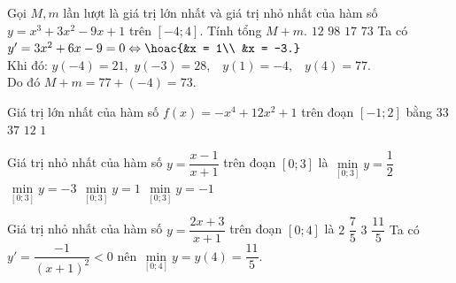 \begin{ex}
	Gọi $ M, m $ lần lượt là giá trị lớn nhất và giá trị nhỏ nhất của hàm số $ y = x^3 + 3x^2 - 9x + 1 $ trên $ [-4;4] $. Tính tổng $ M + m. $
	\choice 
	{$ 12 $}
	{$ 98 $}
	{$ 17 $}
	{\True $ 73 $}
	\loigiai
	{
		Ta có $ y' = 3x^2 + 6x - 9 = 0 \Leftrightarrow \hoac{&x = 1\\ &x = -3.} $\\
		Khi đó: $ y(-4) = 21 $,\, $ y(-3) = 28, $
		\, $ y(1) = -4, $
		\, $ y(4) = 77. $\\
		Do đó $ M + m = 77 + (-4) = 73. $
	}
\end{ex} 

\begin{ex}
	Giá trị lớn nhất của hàm số $f(x)=-x^4+12x^2+1$ trên đoạn $\left[ -1;2\right] $ bằng
	\choice
	{\True $33$}
	{$37$}
	{$12$}
	{$1$}
\end{ex} 

\begin{ex}%
	Giá trị nhỏ nhất của hàm số $y=\dfrac{x-1}{x+1}$ trên đoạn $[0;3]$ là
	\choice
	{$\min\limits_{[0;3]}y=\dfrac{1}{2}$}
	{$\min\limits_{[0;3]}y=-3$}
	{$\min\limits_{[0;3]}y=1$}
	{\True $\min\limits_{[0;3]}y=-1$}	
\end{ex} 

\begin{ex}%
	Giá trị nhỏ nhất của hàm số $y=\dfrac{2x+3}{x+1}$ trên đoạn $[0;4]$ là
	\choice
	{$2$}
	{$\dfrac{7}{5}$}
	{$3$}
	{\True $\dfrac{11}{5}$}
	\loigiai
	{
		Ta có $y'=\dfrac{-1}{(x+1)^2}<0$ nên $\min\limits_{[0;4]} y=y(4)=\dfrac{11}{5}$.
	}
\end{ex} 

